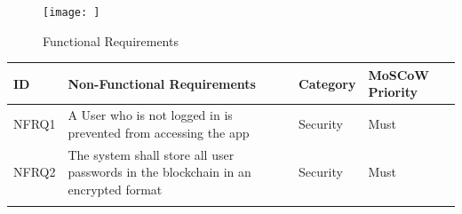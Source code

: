 \documentclass[12pt]{report}
\begin{document}
\begin{figure}[htbp]
\centering
\texttt{[image: ]}
\caption{Functional Requirements}
\end{figure}

\begin{longtable}[]{@{}llll@{}}
\toprule
\begin{minipage}[b]{0.05\columnwidth}\raggedright\strut
ID\strut
\end{minipage} & \begin{minipage}[b]{0.63\columnwidth}\raggedright\strut
Non-Functional Requirements\strut
\end{minipage} & \begin{minipage}[b]{0.10\columnwidth}\raggedright\strut
Category\strut
\end{minipage} & \begin{minipage}[b]{0.11\columnwidth}\raggedright\strut
MoSCoW Priority\strut
\end{minipage}\tabularnewline
\midrule
\endhead
\begin{minipage}[t]{0.05\columnwidth}\raggedright\strut
NFRQ1\strut
\end{minipage} & \begin{minipage}[t]{0.63\columnwidth}\raggedright\strut
A User who is not logged in is prevented from accessing the app\strut
\end{minipage} & \begin{minipage}[t]{0.10\columnwidth}\raggedright\strut
Security\strut
\end{minipage} & \begin{minipage}[t]{0.11\columnwidth}\raggedright\strut
Must\strut
\end{minipage}\tabularnewline
\begin{minipage}[t]{0.05\columnwidth}\raggedright\strut
NFRQ2\strut
\end{minipage} & \begin{minipage}[t]{0.63\columnwidth}\raggedright\strut
The system shall store all user passwords in the blockchain in an
encrypted format\strut
\end{minipage} & \begin{minipage}[t]{0.10\columnwidth}\raggedright\strut
Security\strut
\end{minipage} & \begin{minipage}[t]{0.11\columnwidth}\raggedright\strut
Must\strut
\end{minipage}\tabularnewline
\begin{minipage}[t]{0.05\columnwidth}\raggedright\strut

\end{minipage}
\end{longtable}
\end{document}
